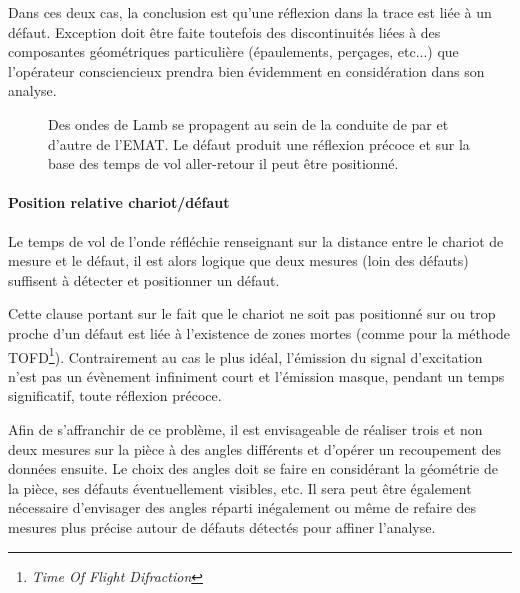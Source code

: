 Dans ces deux cas, la conclusion est qu'une réflexion dans la trace est liée à un défaut. Exception doit être faite toutefois des discontinuités liées à des composantes géométriques particulière (épaulements, perçages, etc...) que l'opérateur consciencieux prendra bien évidemment en considération dans son analyse.

\begin{figure}
	\centering
	\caption{Des ondes de Lamb se propagent au sein de la conduite de par et d'autre de
	l'EMAT. Le défaut produit une réflexion précoce et sur la base des temps de vol
	aller-retour il peut être positionné.}
	\label{emat:ondes_conduite}
\end{figure}

\paragraph{Position relative chariot/défaut}
Le temps de vol de l'onde réfléchie renseignant sur la distance entre le chariot de mesure et le défaut, il est alors logique que deux mesures (loin des défauts) suffisent à détecter et positionner un défaut.

Cette clause portant sur le fait que le chariot ne soit pas positionné sur ou trop proche d'un défaut est liée à l'existence de zones mortes (comme pour la méthode TOFD\footnote{\textit{Time Of Flight Difraction}}).
Contrairement au cas le plus idéal, l'émission du signal d'excitation n'est pas un évènement infiniment court et l'émission masque, pendant un temps significatif, toute réflexion précoce.

Afin de s'affranchir de ce problème, il est envisageable de réaliser trois et non deux mesures sur la pièce à des angles différents et d'opérer un recoupement des données ensuite. Le choix des angles doit se faire en considérant la géométrie de la pièce, ses défauts éventuellement visibles, etc. Il sera peut être également nécessaire d'envisager des angles réparti inégalement ou même de refaire des mesures plus précise autour de défauts détectés pour affiner l'analyse.

